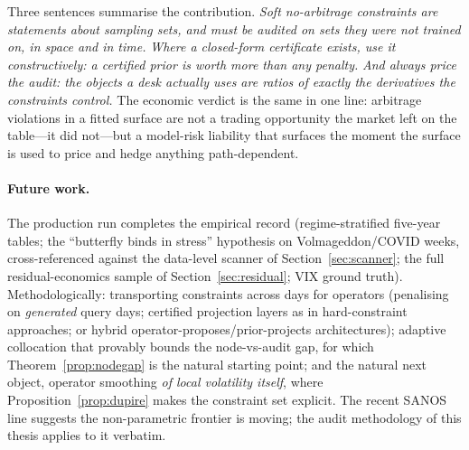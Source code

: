 Three sentences summarise the contribution. \emph{Soft no-arbitrage constraints are
statements about sampling sets, and must be audited on sets they were not trained on, in
space and in time.} \emph{Where a closed-form certificate exists, use it constructively: a
certified prior is worth more than any penalty.} \emph{And always price the audit: the
objects a desk actually uses are ratios of exactly the derivatives the constraints control.}
The economic verdict is the same in one line: arbitrage violations in a fitted surface are not
a trading opportunity the market left on the table---it did not---but a model-risk liability
that surfaces the moment the surface is used to price and hedge anything path-dependent.

\paragraph{Future work.} The production run completes the empirical record (regime-stratified
five-year tables; the ``butterfly binds in stress'' hypothesis on Volmageddon/COVID weeks,
cross-referenced against the data-level scanner of Section~\ref{sec:scanner}; the full
residual-economics sample of Section~\ref{sec:residual}; VIX ground truth). Methodologically:
transporting constraints across days for operators (penalising on \emph{generated} query
days; certified projection layers as in hard-constraint approaches; or hybrid
operator-proposes/prior-projects architectures); adaptive collocation that provably bounds
the node-vs-audit gap, for which Theorem~\ref{prop:nodegap} is the natural starting
point; and the natural next object, operator smoothing \emph{of local volatility itself},
where Proposition~\ref{prop:dupire} makes the constraint set explicit. The recent SANOS line
\cite{sanos2026} suggests the non-parametric frontier is moving; the audit methodology of
this thesis applies to it verbatim.